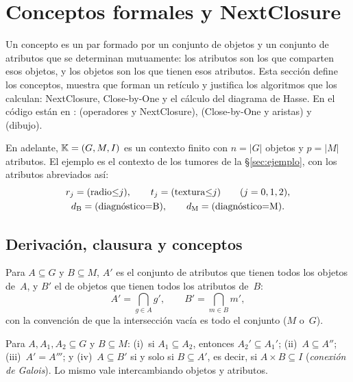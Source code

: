 \section{Conceptos formales y NextClosure}
\label{sec:conceptos}

Un concepto es un par formado por un conjunto de objetos y un conjunto de atributos que se determinan mutuamente: los atributos son los que comparten esos objetos, y los objetos son los que tienen esos atributos. Esta sección define los conceptos, muestra que forman un retículo y justifica los algoritmos que los calculan: NextClosure, Close-by-One y el cálculo del diagrama de Hasse. En el código están en :  (operadores y NextClosure),  (Close-by-One y aristas) y  (dibujo).

En adelante, $\mathbb{K} = (G, M, I)$ es un contexto finito con $n = \lvert G \rvert$ objetos y $p = \lvert M \rvert$ atributos. El ejemplo es el contexto de los tumores de la \S\ref{sec:ejemplo}, con los atributos abreviados así:
\begin{gather*}
  r_j = (\text{radio}{\le}j), \qquad t_j = (\text{textura}{\le}j) \qquad (j = 0, 1, 2), \\
  d_{\mathrm{B}} = (\text{diagnóstico}{=}\mathrm{B}), \qquad d_{\mathrm{M}} = (\text{diagnóstico}{=}\mathrm{M}).
\end{gather*}


\subsection{Derivación, clausura y conceptos}
\label{sec:derivacion}

\begin{definicion}\label{def:derivacion}
Para $A \subseteq G$ y $B \subseteq M$, $A'$ es el conjunto de atributos que tienen todos los objetos de~$A$, y $B'$ el de objetos que tienen todos los atributos de~$B$:
\begin{equation}\label{eq:interseccion}
  A' = \bigcap_{g \in A} g', \qquad B' = \bigcap_{m \in B} m',
\end{equation}
con la convención de que la intersección vacía es todo el conjunto ($M$ o~$G$).
\end{definicion}

\begin{proposicion}\label{prop:derivacion}
Para $A, A_1, A_2 \subseteq G$ y $B \subseteq M$: (i)~si $A_1 \subseteq A_2$, entonces $A_2' \subseteq A_1'$; (ii)~$A \subseteq A''$; (iii)~$A' = A'''$; y (iv)~$A \subseteq B'$ si y solo si $B \subseteq A'$, es decir, si $A \times B \subseteq I$ (\emph{conexión de Galois}). Lo mismo vale intercambiando objetos y atributos.
\end{proposicion}

